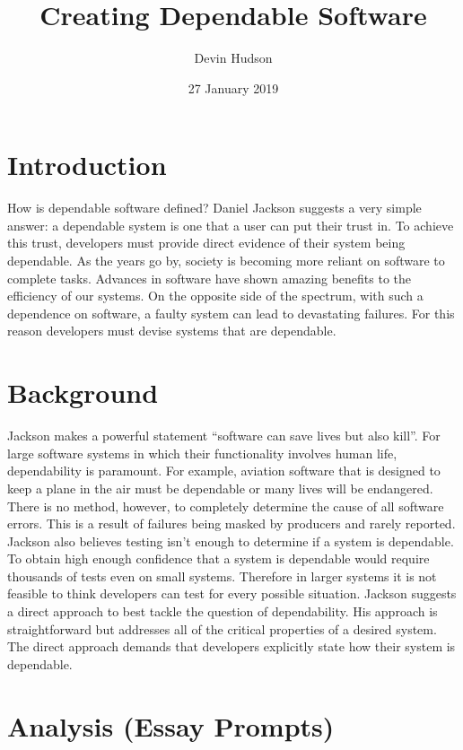 \documentclass[11pt]{article}
\title{Creating Dependable Software}
\author{Devin Hudson}
\date{27 January 2019}
\begin{document}
\maketitle

\thispagestyle{empty}

\begin{doublespace}
  \section{Introduction}

   How is dependable software defined? Daniel Jackson suggests a very simple answer: a dependable system is one that a user can put their trust in\cite{jackson2009}. To achieve this trust, developers must provide direct evidence of their system being dependable. As the years go by, society is becoming more reliant on software to complete tasks. Advances in software have shown amazing benefits to the efficiency of our systems. On the opposite side of the spectrum, with such a dependence on software, a faulty system can lead to devastating failures. For this reason developers must devise systems that are dependable. 

  \section{Background}

  Jackson makes a powerful statement ``software can save lives but also kill''\cite{jackson2009}. For large software systems in which their functionality involves human life, dependability is paramount. For example, aviation software that is designed to keep a plane in the air must be dependable or many lives will be endangered\cite{beck124}. There is no method, however, to completely determine the cause of all software errors. This is a result of failures being masked by producers and rarely reported. Jackson also believes testing isn't enough to determine if a system is dependable\cite{jackson2009}. To obtain high enough confidence that a system is dependable would require thousands of tests even on small systems. Therefore in larger systems it is not feasible to think developers can test for every possible situation. Jackson suggests a direct approach to best tackle the question of dependability. His approach is straightforward but addresses all of the critical properties of a desired system. The direct approach demands that developers explicitly state how their system is dependable.

  \section{Analysis (Essay Prompts)}
  

\end{doublespace}
\end{document}
